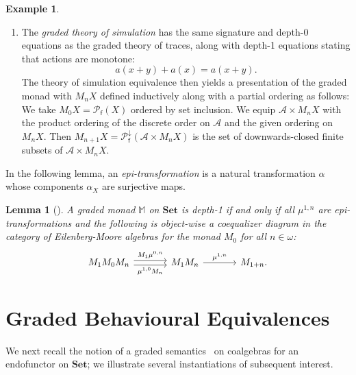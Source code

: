 \documentclass[sigconf,
			final%
			nonacm
                        ]{acmart}
\newcommand{\resetCurThmBraces}{%
\gdef\curThmBraceOpen{(}%
\gdef\curThmBraceClose{)}}
\newcommand{\removeThmBraces}{%
\gdef\curThmBraceOpen{}%
\gdef\curThmBraceClose{}}
\newenvironment{notheorembrackets}{\removeThmBraces}{\resetCurThmBraces}
\numberwithin{equation}{section}
\numberwithin{equation}{section}
\theoremstyle{plain}
\newtheorem{lem}[thm]{Lemma}
\theoremstyle{definition}
\newtheorem{expl}[thm]{Example}
\newcommand{\M}{\mathbb{M}}                   %
\newcommand{\Set}{\mathbf{Set}}
\newcommand{\A}{\mathcal{A}}            %
\newcommand{\pow}{\mathscr P}              %
\newcommand{\powf}{\pow_{\mathsf f}}
\begin{document}
\begin{expl}
\begin{enumerate}
\item\label{item:simulation-a} The \emph{graded theory of simulation}
  has the same signature and depth-0 equations as the graded theory of
  traces, %
  along with depth-1 equations stating that actions are monotone:
\[
a(x+y) + a(x) = a(x+y).
\]
The theory of simulation equivalence then
yields a presentation of the graded monad
with $M_nX$ defined inductively along with
a partial ordering as follows: We take
\mbox{$M_0X = \powf(X)$} ordered by set inclusion.
We equip $\A\times M_nX$ with the product ordering
of the discrete order on $\A$ and the given
ordering on $M_nX$. Then $M_{n+1}X = \powf^{\downarrow}(\A\times M_nX)$ is
the set  of downwards-closed finite subsets of
$\A\times M_nX$.
\end{enumerate}
\end{expl}

In the following lemma, an \emph{epi-transformation} is a natural
transformation $\alpha$ whose components $\alpha_X$ are surjective maps.

\begin{notheorembrackets}
\begin{lem}[{\cite{MPS15}}]\label{L:depth-1}
%
  A graded monad $\M$ on $\Set$ is \emph{depth-1} if and only if
  all $\mu^{1,n}$ are epi-transformations and the following is
  object-wise a coequalizer diagram in the category of
  Eilenberg-Moore algebras for the monad $M_0$ for all
  $n\in\omega$:
  \begin{equation}
    \begin{tikzcd}[column sep = 35]\label{Diagram:depth1}
      M_1M_0M_n \arrow[r, "M_1\mu^{0,n}", shift left] \arrow[r,
      "\mu^{1,0}M_n"', shift right] & M_1M_n \arrow[r, "\mu^{1,n}"] &
      M_{1+n}.
    \end{tikzcd}
  \end{equation}
\end{lem}
\end{notheorembrackets}

\section{Graded Behavioural Equivalences}\label{sec:semantics}
We next recall the notion of a graded semantics~\cite{MPS15}
on coalgebras for an endofunctor on $\Set$;
we illustrate several instantiations of subsequent interest.

\end{document}
